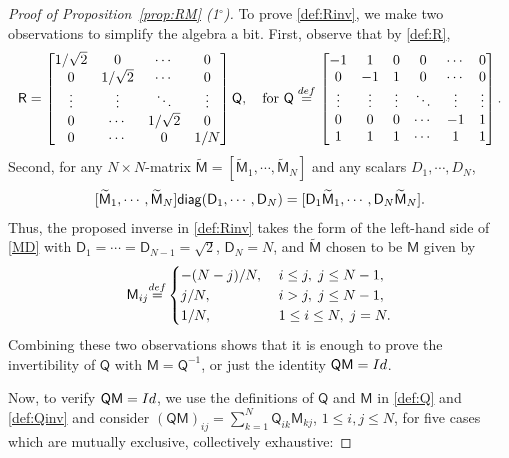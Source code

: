 \documentclass[10pt,a4paper]{amsart}
\newcommand{\Id}{{\rm Id}}
\newcommand{\cc}{{^\circ}}
\newcommand{\defeq}{{\stackrel{\rm def}{=}}}
\newcommand{\two}{{\sqrt{2}}}
\begin{document}
\begin{proof}[Proof of Proposition~\ref{prop:RM} (1$\cc$)]
To prove \eqref{def:Rinv}, we make two observations to simplify the algebra a bit.
First, observe that by \eqref{def:R},
\begin{align}\label{def:Q}
\mathsf R=\begin{bmatrix}
1/\two &0&\cdots &0\\
0 &1/\two&\cdots &0\\
\vdots &\vdots &\ddots &\vdots\\
0 &\cdots & 1/\two &0\\
0 &\cdots &0 &1/N
\end{bmatrix} 
\mathsf  Q,\quad \mbox{for }\mathsf Q\;\defeq\, \begin{bmatrix}
-1 & 1 & 0&0&\cdots &0\\
0 &-1&1& 0&\cdots &0\\
\vdots &\vdots &\vdots &\ddots &\vdots&\vdots\\
0 &0 &0&\cdots &-1 &1\\
1&1 &1&\cdots &1 &1
\end{bmatrix}.
\end{align}
Second, for any $N\times N$-matrix $\widetilde{\mathsf M}=[\widetilde{\mathsf M}_1,\cdots,\widetilde{\mathsf M}_N]$ and any scalars $D_1,\cdots,D_N$,
\begin{align}\label{MD}
[\widetilde{\mathsf M}_1,\cdots,\widetilde{\mathsf M}_N]\mathsf {\rm diag}(\mathsf D_1,\cdots,\mathsf D_N)=[\mathsf D_1\widetilde{\mathsf M}_1,\cdots,\mathsf D_N \widetilde{\mathsf M}_N].
\end{align}
Thus, the proposed inverse in \eqref{def:Rinv} takes the form of the left-hand side of \eqref{MD} with $\mathsf D_1=\cdots=\mathsf D_{N-1}=\sqrt{2}$, $\mathsf D_N=N$, and $\widetilde{\mathsf M}$ chosen to be $\mathsf M$ given by 
\begin{align}\label{def:Qinv}
\mathsf M_{ij}\defeq
\begin{cases}
\displaystyle -(N-j)/N,&\; i\leq j,\; j\leq N-1,\\
\displaystyle j/N,&\;i>j,\;j\leq N-1,\\
\displaystyle 1/N, &\;1\leq i\leq N,\;j=N.
\end{cases}
\end{align} 
Combining these two observations shows that it is enough to prove the invertibility of $\mathsf Q$ with $\mathsf M=\mathsf Q^{-1}$, or just the identity
$\mathsf Q\mathsf M=\Id $. 

Now, to verify $\mathsf Q\mathsf M=\Id $, we use the definitions of $\mathsf Q$ and $\mathsf M$
 in \eqref{def:Q} and \eqref{def:Qinv} and consider $(\mathsf Q\mathsf M)_{ij}=\sum_{k=1}^N \mathsf Q_{ik}\mathsf M_{kj}$, $1\leq i,j\leq N$, for five cases which are mutually exclusive, collectively exhaustive: \medskip 


\end{proof}
\end{document}

